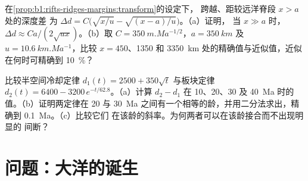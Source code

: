 \begin{exercise}[$\star\star\star$]\label{exo:b1:rifts-ridges-margins:11}
在\cref{prop:b1:rifts-ridges-margins:transform}的设定下，
跨越、距较远洋脊段 $x > a$ 处的深度差
为 $\Delta d = C\bigl(\sqrt{x/u} - \sqrt{(x - a)/u}\bigr)$。（a）证明，
当 $x \gg a$ 时，$\Delta d \approx Ca/(2\sqrt{ux})$。（b）取
$C = \qty{350}{m.Ma^{-1/2}}$，$a = \qty{350}{km}$ 及
$u = \qty{10.6}{km.Ma^{-1}}$，比较
$x = 450$、1350 和 \qty{3350}{km} 处的精确值与近似值，近似在何时可精确到
\qty{10}{\percent}？
\end{exercise}

\begin{exercise}[$\star\star\star$]\label{exo:b1:rifts-ridges-margins:12}
比较半空间冷却定律 $d_1(t) = 2500 + 350\sqrt t$ 与板块定律
$d_2(t) = 6400 - 3200\,e^{-t/62.8}$。（a）计算 $d_2 - d_1$ 在 10、20、30 及
\qty{40}{Ma} 时的值。（b）证明两定律在 20 与
\qty{30}{Ma} 之间有一个相等的龄，并用二分法求出，精确到 \qty{0.1}{Ma}。（c）比较它们
在该龄的斜率。为何两者可以在该龄接合而不出现明显的
间断？
\end{exercise}

\section{问题：大洋的诞生}


